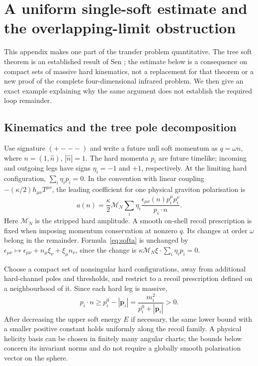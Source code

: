 \section{A uniform single-soft estimate and the overlapping-limit obstruction}\label{app:softremainder}

This appendix makes one part of the transfer problem quantitative. The tree soft theorem is an established result of Sen \cite{Sen17tree}; the estimate below is a consequence on compact sets of massive hard kinematics, not a replacement for that theorem or a new proof of the complete four-dimensional infrared problem. We then give an exact example explaining why the same argument does not establish the required loop remainder.

\subsection{Kinematics and the tree pole decomposition}

Use signature $(+---)$ and write a future null soft momentum as $q=\omega n$, where $n=(1,\widehat n)$, $|\widehat n|=1$. The hard momenta $p_i$ are future timelike; incoming and outgoing legs have signs $\eta_i=-1$ and $+1$, respectively. At the limiting hard configuration, $\sum_i\eta_i p_i=0$. In the convention with linear coupling $-(\kappa/2)h_{\mu\nu}T^{\mu\nu}$, the leading coefficient for one physical graviton polarisation is
\begin{equation}\label{eq:softa}
 a(n)=\frac{\kappa}{2}\mathcal M_N
       \sum_i\eta_i\frac{\epsilon_{\mu\nu}(n)p_i^\mu p_i^\nu}{p_i\cdot n}.
\end{equation}
Here $\mathcal M_N$ is the stripped hard amplitude. A smooth on-shell recoil prescription is fixed when imposing momentum conservation at nonzero $q$. Its changes at order $\omega$ belong in the remainder. Formula~\eqref{eq:softa} is unchanged by $\epsilon_{\mu\nu}\mapsto\epsilon_{\mu\nu}+n_\mu\xi_\nu+\xi_\mu n_\nu$, since the change is $\kappa\mathcal M_N\xi\cdot\sum_i\eta_i p_i=0$.

Choose a compact set of nonsingular hard configurations, away from additional hard-channel poles and thresholds, and restrict to a recoil prescription defined on a neighbourhood of it. Since each hard leg is massive,
\begin{equation}\label{eq:massivegap}
 p_i\cdot n\ge p_i^0-|\boldsymbol p_i|
 =\frac{m_i^2}{p_i^0+|\boldsymbol p_i|}>0.
\end{equation}
After decreasing the upper soft energy $E$ if necessary, the same lower bound with a smaller positive constant holds uniformly along the recoil family. A physical helicity basis can be chosen in finitely many angular charts; the bounds below concern its invariant norms and do not require a globally smooth polarisation vector on the sphere.

